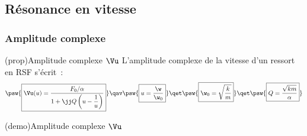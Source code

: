 \documentclass[../../main/main.tex]{subfiles}
\begin{document}

\subsection{Résonance en vitesse}
\subsubsection{Amplitude complexe}
\begin{tcb}(prop){Amplitude complexe $\Vu$}
	L'amplitude complexe de la vitesse d'un ressort en RSF s'écrit~:
	\begin{gather*}
		\psw{
			\boxed{
				\Vu(u) = \frac{F_0/\alpha}{1 + \jj Q \left( u - \dfrac{1}{u} \right)}}
		}
		\qav
		\psw{\boxed{u = \frac{\w}{\w_0}}}
		\qet
		\psw{\boxed{\w_0 = \sqrt{\frac{k}{m}}}}
		\qet
		\psw{\boxed{Q = \frac{\sqrt{km}}{\alpha}}}
	\end{gather*}
	\vspace{-15pt}
\end{tcb}

\begin{tcb*}(demo){Amplitude complexe $\Vu$}
	\vspace{-10pt}
\end{tcb*}
\end{document}
